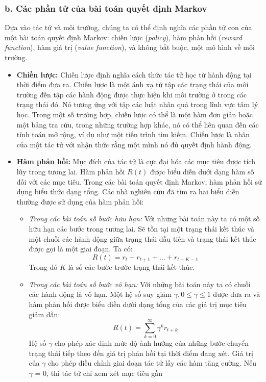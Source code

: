 \documentclass[12pt,a4paper]{report}
\begin{document}
\subsubsection{b. Các phần tử của bài toán quyết định Markov}
Dựa vào tác tử và môi trường, chúng ta có thể định nghĩa các phần tử con của một bài
toán quyết định Markov: chiến lược (\textit{policy}), hàm phản hồi (\textit{reward function}), hàm giá trị
(\textit{value function}), và không bắt buộc, một mô hình về môi trường.
\begin{itemize}
	\item \textbf{Chiến lược:} Chiến lược định nghĩa cách thức tác tử học từ hành động tại thời điểm đưa ra. Chiến lược
	là một ánh xạ từ tập các trạng thái của môi trường đến tập các hành động được thực hiện khi
	môi trường ở trong các trạng thái đó. Nó tương ứng với tập các luật nhân quả trong lĩnh vực
	tâm lý học. Trong một số trường hợp, chiến lược có thể là một hàm đơn giản hoặc một bảng
	tra cứu, trong những trường hợp khác, nó có thể liên quan đến các tính toán mở rộng, ví dụ
	như một tiến trình tìm kiếm. Chiến lược là nhân của một tác tử với nhận thức rằng một mình
	nó đủ quyết định hành động.
	\item \textbf{Hàm phản hồi:} 
	Mục đích của tác tử là cực đại hóa các mục tiêu được tích lũy trong tương lai. Hàm phản
	hồi $R(t)$ được biểu diễn dưới dạng hàm số đối với các mục tiêu. Trong các bài toán quyết
	định Markov, hàm phản hồi sử dụng biểu thức dạng tổng. Các nhà nghiên cứu đã tìm ra hai
	biểu diễn thường được sử dụng của hàm phản hồi:
	\begin{itemize}
		\item \textit{Trong các bài toán số bước hữu hạn: } Với những bài toán này ta có một số hữu hạn các bước trong tương lai. Sẽ tồn tại một
		trạng thái kết thúc và một chuỗi các hành động giữa trạng thái đầu tiên và trạng thái
		kết thúc được gọi là một giai đoạn. Ta có: $$R(t) = r_t + r_{t+1} + ... + r_{t+K-1}$$ Trong đó $K$ là số các bước trước trạng thái kết thúc.
		\item \textit{ Trong các bài toán số bước vô hạn: } Với những bài toán này ta có chuỗi các hành động là vô hạn. Một hệ số suy giảm
		$\gamma, 0\leq\gamma 
		\leq 1 $ được đưa ra và hàm phản hồi được biểu diễn dưới dạng tổng của các giá
		trị mục tiêu giảm dần: $$R(t) = \sum_{k=0}^{\infty}\gamma^kr_{t+k}$$
		Hệ số $\gamma$ cho phép xác định mức độ ảnh hưởng của những bước chuyển trạng thái tiếp
		theo đến giá trị phản hồi tại thời điểm đang xét. Giá trị của $\gamma$ cho phép điều chỉnh giai
		đoạn tác tử lấy các hàm tăng cường. Nếu $\gamma$ = 0, thì tác tử chỉ xem xét mục tiêu gần

\end{itemize}
\end{itemize}
\end{document}
